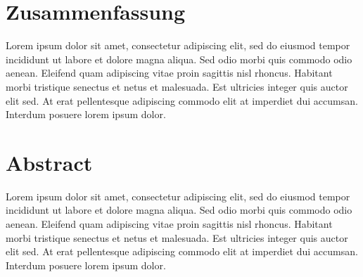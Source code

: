 \section*{Zusammenfassung}
Lorem ipsum dolor sit amet, consectetur adipiscing elit, sed do eiusmod tempor incididunt ut labore et dolore magna aliqua. Sed odio morbi quis commodo odio aenean. Eleifend quam adipiscing vitae proin sagittis nisl rhoncus. Habitant morbi tristique senectus et netus et malesuada. Est ultricies integer quis auctor elit sed. At erat pellentesque adipiscing commodo elit at imperdiet dui accumsan. Interdum posuere lorem ipsum dolor.
\newpage
\section*{Abstract}
Lorem ipsum dolor sit amet, consectetur adipiscing elit, sed do eiusmod tempor incididunt ut labore et dolore magna aliqua. Sed odio morbi quis commodo odio aenean. Eleifend quam adipiscing vitae proin sagittis nisl rhoncus. Habitant morbi tristique senectus et netus et malesuada. Est ultricies integer quis auctor elit sed. At erat pellentesque adipiscing commodo elit at imperdiet dui accumsan. Interdum posuere lorem ipsum dolor.
\newpage